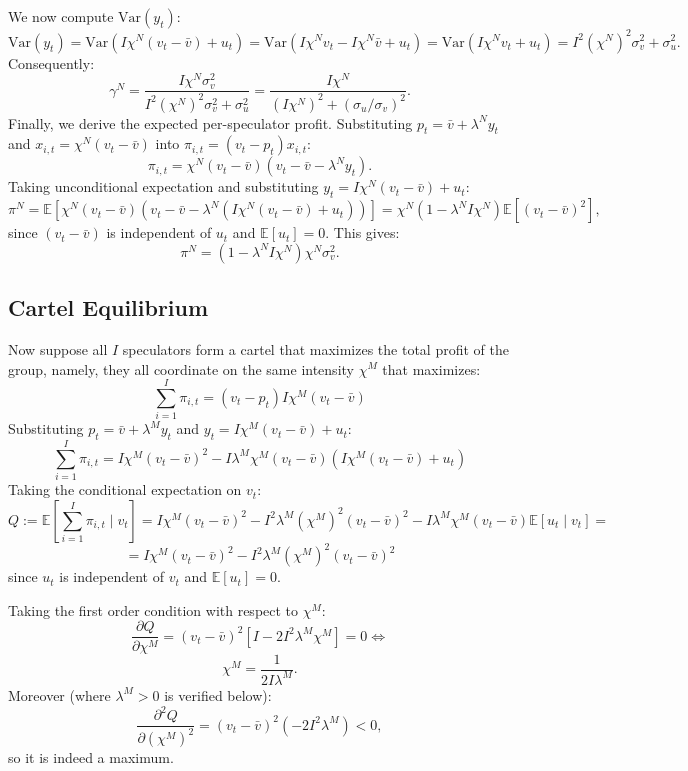 \documentclass[11pt]{article}
\begin{document}
We now compute $\text{Var}(y_t)$:
\[
\text{Var}(y_t)=\text{Var}(I\chi^N(v_t-\bar{v})+u_t)=\text{Var}(I\chi^N v_t-I\chi^N \bar{v}+u_t)=\text{Var}(I\chi^N v_t+u_t)=I^2(\chi^N)^2\sigma_v^2+\sigma_u^2.
\]
Consequently:
\begin{equation}
    \gamma^N=\frac{I\chi^N \sigma_v^2}{I^2(\chi^N)^2\sigma_v^2+\sigma_u^2}=\frac{I\chi^N}{(I\chi^N)^2+(\sigma_u/\sigma_v)^2}.
\end{equation}
Finally, we derive the expected per-speculator profit. Substituting $p_t=\bar{v}+\lambda^N y_t$ 
and $x_{i,t}=\chi^N(v_t-\bar{v})$ into $\pi_{i,t}=(v_t-p_t)x_{i,t}$:
\[
\pi_{i,t}=\chi^N(v_t-\bar{v})(v_t-\bar{v}-\lambda^N y_t).
\]
Taking unconditional expectation and substituting $y_t = I\chi^N(v_t-\bar{v})+u_t$:
\[
\pi^N=\mathbb{E}\left[\chi^N(v_t-\bar{v})(v_t-\bar{v}-\lambda^N(I\chi^N(v_t-\bar{v})+u_t))\right]=\chi^N(1-\lambda^NI\chi^N)\mathbb{E}[(v_t-\bar{v})^2],
\]
since $(v_t-\bar{v})$ is independent of $u_t$ and $\mathbb{E}[u_t]=0$. This gives:
\begin{equation}
    \pi^N=(1-\lambda^NI\chi^N)\chi^N\sigma_v^2.
\end{equation}



\subsection{Cartel Equilibrium}
Now suppose all $I$ speculators form a cartel that maximizes the total profit of the group, namely, they all coordinate on the same intensity $\chi^M$ that maximizes:
\[
\sum_{i=1}^I\pi_{i,t}=(v_t-p_t)I\chi^M(v_t-\bar{v})
\]
Substituting $p_t=\bar{v}+\lambda^M y_t$ and $y_t=I\chi^M(v_t-\bar{v})+u_t$:
\[
\sum_{i=1}^I\pi_{i,t}=I\chi^M(v_t-\bar{v})^2-I\lambda^M\chi^M(v_t-\bar{v})(I\chi^M(v_t-\bar{v})+u_t)
\]
Taking the conditional expectation on $v_t$:
\[
Q:=\mathbb{E}\left[\sum_{i=1}^I\pi_{i,t}\mid v_t\right]=I\chi^M(v_t-\bar{v})^2-I^2\lambda^M(\chi^M)^2(v_t-\bar{v})^2-I\lambda^M\chi^M(v_t-\bar{v})\mathbb{E}[u_t\mid v_t]=
\]
\[
=I\chi^M(v_t-\bar{v})^2-I^2\lambda^M(\chi^M)^2(v_t-\bar{v})^2
\]
since $u_t$ is independent of $v_t$ and $\mathbb{E}[u_t]=0$.

Taking the first order condition with respect to $\chi^M$:
\[
\frac{\partial Q}{\partial \chi^M}=(v_t-\bar{v})^2\left[I-2I^2\lambda^M\chi^M\right]=0\iff
\]
\begin{equation}
    \chi^M=\frac{1}{2I\lambda^M}.
\end{equation}
Moreover (where $\lambda^M>0$ is verified below):
\[
\frac{\partial^2 Q}{\partial (\chi^M)^2}=(v_t-\bar{v})^2(-2I^2\lambda^M)<0,
\]
so it is indeed a maximum.
\end{document}
